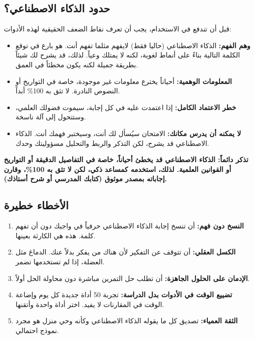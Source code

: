 \documentclass[12pt,a4paper]{book}
\newcommand{\importantAr}[1]{%
	\begin{important}
		\bfseries #1
	\end{important}
}
\begin{document}
\subsection{حدود الذكاء الاصطناعي؟}

قبل أن تندفع في الاستخدام، يجب أن تعرف نقاط الضعف الحقيقية لهذه الأدوات:

\begin{itemize}
	\item \textbf{وهم الفهم:} الذكاء الاصطناعي (حاليا فقط) لايفهم مثلما تفهم أنت. هو بارع في توقع الكلمة التالية بناءً على أنماط لغوية، لكنه لا يمتلك وعياً. لذلك، قد يشرح لك شيئاً بطريقة جميلة لكنه يكون مخطئاً في العمق.
	\item \textbf{المعلومات الوهمية:} أحياناً يخترع معلومات غير موجودة، خاصة في التواريخ أو النصوص النادرة. لا تثق به 100\% أبداً.
	\item \textbf{خطر الاعتماد الكامل:} إذا اعتمدت عليه في كل إجابة، سيموت فضولك العلمي، وستتحول إلى آلة ناسخة.
	\item \textbf{لا يمكنه أن يدرس مكانك:} الامتحان سيُسأل لك أنت، وسيختبر فهمك أنت. الذكاء الاصطناعي قد يشرح، لكن التذكر والربط والتحليل مسؤوليتك وحدك.
\end{itemize}

\importantAr{تذكر دائماً: الذكاء الاصطناعي قد يخطئ أحياناً، خاصة في التفاصيل الدقيقة أو التواريخ أو القوانين العلمية. لذلك، استخدمه كمساعد ذكي، لكن لا تثق به 100\%، وقارن إجاباته بمصدر موثوق (كتابك المدرسي أو شرح أستاذك).}

\subsection{الأخطاء خطيرة}

\begin{enumerate}
	\item \textbf{النسخ دون فهم:} أن تنسخ إجابة الذكاء الاصطناعي حرفياً في واجبك دون أن تفهم كلمة. هذه هي الكارثة بعينها.
	\item \textbf{الكسل العقلي:} أن تتوقف عن التفكير لأن هناك من يفكر بدلاً عنك. الدماغ مثل العضلة، إذا لم تستخدمها تضمر.
	\item \textbf{الإدمان على الحلول الجاهزة:} أن تطلب حل التمرين مباشرة دون محاولة الحل أولاً.
	\item \textbf{تضييع الوقت في الأدوات بدل الدراسة:} تجربة 50 أداة جديدة كل يوم وإضاعة الوقت في المقارنات لا يفيد. اختر أداة واحدة وأتقنها.
	\item \textbf{الثقة العمياء:} تصديق كل ما يقوله الذكاء الاصطناعي وكأنه وحي منزل هو مجرد نموذج احتمالي.
\end{enumerate}
\end{document}
